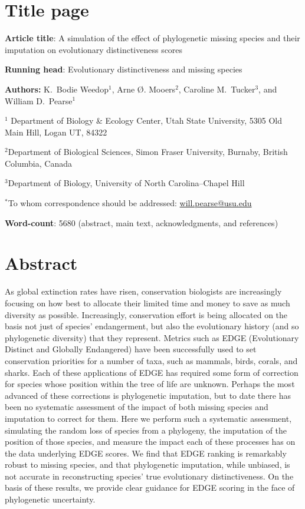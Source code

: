\documentclass[12pt,english]{article}
\begin{document}
\setlength{\parindent}{0pt}
\section*{Title page}

\textbf{Article title}: A simulation of the effect of phylogenetic
missing species and their imputation on evolutionary distinctiveness
scores

\textbf{Running head}: Evolutionary distinctiveness and missing
species

\textbf{Authors:} K.\ Bodie Weedop$^{1}$, Arne \O. Mooers$^2$,
Caroline M.\ Tucker$^3$, and William D.\ Pearse$^{1}$\

$^1$ Department of Biology \& Ecology Center, Utah State University,
5305 Old Main Hill, Logan UT, 84322

$^2$Department of Biological Sciences, Simon Fraser University,
Burnaby, British Columbia, Canada

$^3$Department of Biology, University of North Carolina--Chapel Hill

$^*$To whom correspondence should be addressed:
\url{will.pearse@usu.edu}

\textbf{Word-count}: 5680 (abstract, main text, acknowledgments, and
  references)

\clearpage
\section*{Abstract}

As global extinction rates have risen, conservation biologists are
increasingly focusing on how best to allocate their limited time and
money to save as much diversity as possible. Increasingly, conservation
effort is being allocated on the basis not just of species'
endangerment, but also the evolutionary history (and so phylogenetic
diversity) that they represent. Metrics such as EDGE (Evolutionary
Distinct and Globally Endangered) have been successfully used to set
conservation priorities for a number of taxa, such as mammals, birds,
corals, and sharks.  Each of these applications of EDGE has required
some form of correction for species whose position within the tree of
life are unknown. Perhaps the most advanced of these corrections is
phylogenetic imputation, but to date there has been no systematic
assessment of the impact of both missing species and imputation to
correct for them. Here we perform such a systematic assessment,
simulating the random loss of species from a phylogeny, the imputation
of the position of those species, and measure the impact each of these
processes has on the data underlying EDGE scores. We find that EDGE
ranking is remarkably robust to missing species, and that phylogenetic
imputation, while unbiased, is not accurate in reconstructing species'
true evolutionary distinctiveness. On the basis of these results, we
provide clear guidance for EDGE scoring in the face of phylogenetic
uncertainty.
\end{document}
